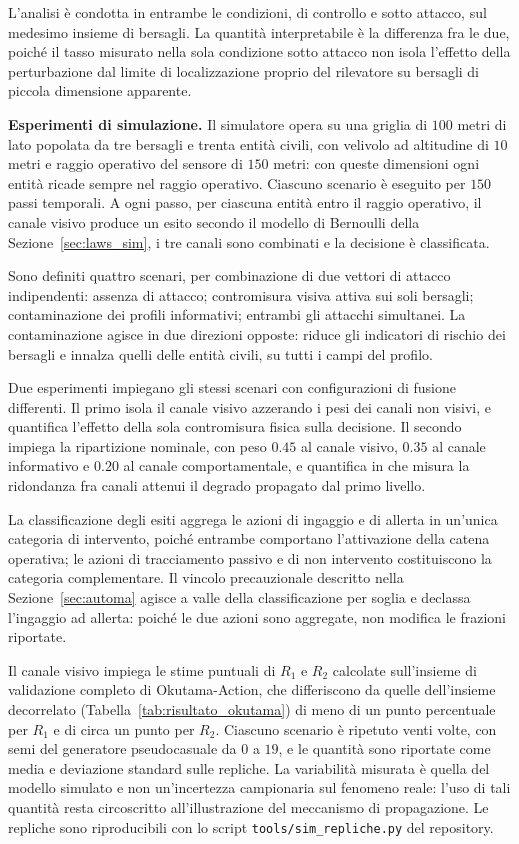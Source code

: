 \ifstampa\documentclass[a4paper,12pt,twoside,openright]{report}\else\documentclass[a4paper,12pt]{report}\fi
\newif\ifrevisione \revisionefalse
\DeclareRobustCommand{\rev}[1]{\ifrevisione{\color{blue!65!black}#1}\else#1\fi}
\begin{document}
L'analisi è condotta in entrambe le condizioni, di controllo e sotto attacco,
sul medesimo insieme di bersagli. La quantità interpretabile è la differenza fra
le due, poiché il tasso misurato nella sola condizione sotto attacco non isola
l'effetto della perturbazione dal limite di localizzazione proprio del
rilevatore su bersagli di piccola dimensione apparente.

\textbf{Esperimenti di simulazione.}
\label{sec:esperimenti_sim}
Il simulatore opera su una griglia di $100$ metri di lato popolata da tre
bersagli e trenta entità civili, con velivolo ad altitudine di $10$ metri e
raggio operativo del sensore di $150$ metri\rev{: con queste dimensioni ogni
entità ricade sempre nel raggio operativo}. Ciascuno scenario è eseguito per
$150$ passi temporali. A ogni passo, per ciascuna entità entro il raggio
operativo, il canale visivo produce un esito secondo il modello di Bernoulli
della Sezione~\ref{sec:laws_sim}, i tre canali sono combinati e la decisione è
classificata.

Sono definiti quattro scenari, per combinazione di due vettori di attacco
indipendenti: assenza di attacco; contromisura visiva attiva sui soli bersagli;
contaminazione dei profili informativi; entrambi gli attacchi simultanei. La
contaminazione agisce in due direzioni opposte: riduce gli indicatori di
rischio dei bersagli e innalza quelli delle entità civili, su tutti i campi
del profilo.

Due esperimenti impiegano gli stessi scenari con configurazioni di fusione
differenti. Il primo isola il canale visivo azzerando i pesi dei canali non
visivi, e quantifica l'effetto della sola contromisura fisica sulla decisione.
Il secondo impiega la ripartizione nominale, con peso $0.45$ al canale visivo,
$0.35$ al canale informativo e $0.20$ al canale comportamentale, e quantifica in
che misura la ridondanza fra canali attenui il degrado propagato dal primo
livello.

La classificazione degli esiti aggrega le azioni di ingaggio e di allerta in
un'unica categoria di intervento, poiché entrambe comportano l'attivazione della
catena operativa; le azioni di tracciamento passivo e di non intervento
costituiscono la categoria complementare. Il vincolo precauzionale \rev{descritto
nella Sezione~\ref{sec:automa} agisce a valle della classificazione per soglia
e declassa l'ingaggio ad allerta: poiché le due azioni sono aggregate, non
modifica le frazioni riportate}.

\rev{Il canale visivo impiega le stime puntuali di $R_1$ e $R_2$ calcolate
sull'insieme di validazione completo di Okutama-Action, che differiscono da
quelle dell'insieme decorrelato (Tabella~\ref{tab:risultato_okutama}) di meno
di un punto percentuale per $R_1$ e di circa un punto per $R_2$. Ciascuno
scenario è ripetuto venti volte, con semi del generatore pseudocasuale da $0$
a $19$, e le quantità sono riportate come media e deviazione standard sulle
repliche. La variabilità misurata è quella del modello simulato e non
un'incertezza campionaria sul fenomeno reale: l'uso di tali quantità resta
circoscritto all'illustrazione del meccanismo di propagazione. Le repliche
sono riproducibili con lo script \texttt{tools/sim\_repliche.py} del
repository.}
\end{document}
